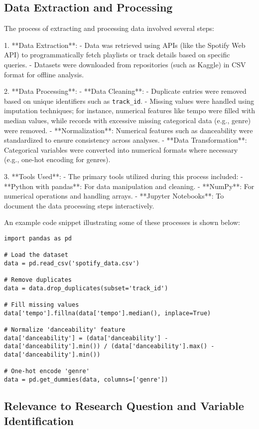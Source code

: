\documentclass[runningheads]{llncs}
\begin{document}
\subsection{Data Extraction and Processing}
The process of extracting and processing data involved several steps:

1. **Data Extraction**:
   - Data was retrieved using APIs (like the Spotify Web API) to programmatically fetch playlists or track details based on specific queries.
   - Datasets were downloaded from repositories (such as Kaggle) in CSV format for offline analysis.

2. **Data Processing**:
   - **Data Cleaning**: 
     - Duplicate entries were removed based on unique identifiers such as \texttt{track\_id}.
     - Missing values were handled using imputation techniques; for instance, numerical features like tempo were filled with median values, while records with excessive missing categorical data (e.g., genre) were removed.
   - **Normalization**: Numerical features such as danceability were standardized to ensure consistency across analyses.
   - **Data Transformation**: Categorical variables were converted into numerical formats where necessary (e.g., one-hot encoding for genres).

3. **Tools Used**:
   - The primary tools utilized during this process included:
     - **Python with pandas**: For data manipulation and cleaning.
     - **NumPy**: For numerical operations and handling arrays.
     - **Jupyter Notebooks**: To document the data processing steps interactively.

An example code snippet illustrating some of these processes is shown below:

\begin{verbatim}
import pandas as pd

# Load the dataset
data = pd.read_csv('spotify_data.csv')

# Remove duplicates
data = data.drop_duplicates(subset='track_id')

# Fill missing values
data['tempo'].fillna(data['tempo'].median(), inplace=True)

# Normalize 'danceability' feature
data['danceability'] = (data['danceability'] - data['danceability'].min()) / (data['danceability'].max() - data['danceability'].min())

# One-hot encode 'genre'
data = pd.get_dummies(data, columns=['genre'])
\end{verbatim}

\subsection{Relevance to Research Question and Variable Identification}
\end{document}
